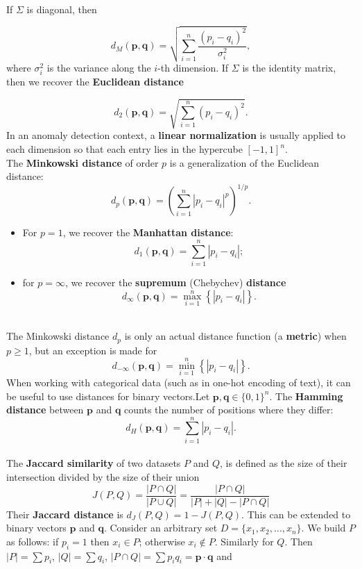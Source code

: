 \documentclass[20pt,landscape,footrule,headrule]{foils}
\newcommand{\newl}{\newline\newline}
\begin{document}
\begin{center}
\end{center}\newpage\ \\ \noindent If  $\Sigma$ is diagonal, then 

$$
d_M(\mathbf{p},\mathbf{q})=\sqrt{\sum_{i=1}^n \frac{(p_i - q_i)^2}{\sigma_i^2}},
$$
where $\sigma_i^2$ is the variance along the $i$-th dimension.
\newl If $\Sigma$ is the identity matrix, then we recover the \textbf{Euclidean distance}

$$
d_2(\mathbf{p},\mathbf{q})=\sqrt{\sum_{i=1}^n (p_i - q_i)^2}.
$$
\noindent In an anomaly detection context, a \textbf{linear normalization} is usually applied to each dimension so that each entry lies in the hypercube  $[-1,1]^n$.
\newpage\ \\ \noindent The \textbf{Minkowski distance} of order $p$ is a generalization of the Euclidean distance:
$$
d_p(\mathbf{p},\mathbf{q})=\left( \sum_{i=1}^n |p_i - q_i|^p \right)^{1/p}.
$$
\begin{itemize}
\item For $p=1$, we recover the \textbf{Manhattan distance}: $$d_1(\mathbf{p},\mathbf{q})=\sum_{i=1}^n|p_i-q_i|;$$ 
\item for $p=\infty$, we recover the \textbf{supremum} (Chebychev) \textbf{distance} $$d_{\infty}(\mathbf{p},\mathbf{q})=\max_{i=1}^n \left\{|p_i - q_i|\right\}.$$ 
\end{itemize}
\newpage\ \\ \noindent The Minkowski distance $d_p$ is only an actual distance function (a \textbf{metric}) when  $p \geq 1$, but an exception is made for 
$$
d_{-\infty}(\mathbf{p},\mathbf{q})=\min_{i=1}^n \left\{|p_i - q_i|\right\}.
$$
When working with categorical data (such as in one-hot encoding of text), it can be useful to use distances for binary vectors.\newl  Let $\mathbf{p},\mathbf{q}\in  \{0,1\}^n$.\newl 
The \textbf{Hamming distance} between $\mathbf{p}$ and $\mathbf{q}$ counts the number of positions where they differ: 
$$d_H(\mathbf{p},\mathbf{q})=\sum_{i=1}^n|p_i-q_i|.$$
\newpage\ \\ \noindent The \textbf{Jaccard similarity} of two datasets $P$ and $Q$, is defined as the size of their intersection divided by the size of their union
$$
J(P,Q)
= \frac{|P \cap Q|}{|P \cup Q|}
= \frac{|P \cap Q|}{|P| + |Q| - |P \cap Q|}
$$
Their \textbf{Jaccard distance} is $d_J(P,Q)=1 - J(P,Q)$. This can be extended to binary vectors $\mathbf{p}$ and $\mathbf{q}$. \newl Consider an arbitrary set $D=\{x_1,x_2,\ldots,x_n\}$. We build $P$ as follows: if $p_i=1$ then $x_i\in P$; otherwise $x_i\not\in P$. Similarly for $Q$. \newl Then $|P|=\sum p_i$, $|Q|=\sum q_i$, $|P\cap Q|=\sum p_iq_i=\mathbf{p}\cdot\mathbf{q}$ and  
\end{document}
